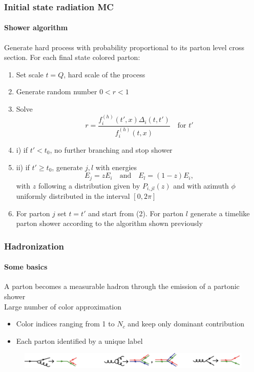\documentclass[aspectratio=43]{beamer}
\begin{document}
\begin{frame}

	\frametitle{Initial state radiation MC}
	\framesubtitle{Shower algorithm}
	
	\footnotesize Generate hard process with probability proportional to its parton level cross section.
	\footnotesize For each final state colored parton:
	\begin{enumerate} 
		\item Set scale $t = Q$, hard scale of the process
		\item Generate random number $0 < r < 1$
		\item Solve $$r = \frac{f^{(h)}_{i}(t', x) \Delta_{i}(t, t')}{f^{(h)}_{i}(t, x)} \quad \textrm{for }t'$$
		\item i) if $t' < t_{0}$, no further branching and stop shower
		\item \footnotesize ii) if $t' \geq t_{0}$, generate $j, l$ with energies $$E_{j} = zE_{i} \quad \textrm{and}\quad E_{l} = (1 - z)E_{i}, $$ with $z$ following a distribution given by  $P_{i, jl}(z)$ and with azimuth $\phi$ uniformly distributed in the interval $[0, 2\pi]$
		\item For parton $j$ set $t = t'$ and start from (2). For parton $l$ generate a timelike parton shower according to the algorithm shown previously
	\end{enumerate}

\end{frame}

\begin{frame}
	
	\frametitle{Hadronization}
	\framesubtitle{Some basics}

	\footnotesize A parton becomes a measurable hadron through the emission of a partonic shower \\
	\footnotesize Large number of color approximation 
	\begin{itemize}
		\item \footnotesize Color indices ranging from 1 to $N_{c}$ and keep only dominant contribution
		\item \footnotesize Each parton identified by a unique label
	\end{itemize}

	\begin{figure}
		\includegraphics[width = 8.5 cm]{plots/hadronization.png}
	\end{figure}

\end{frame}
\end{document}
